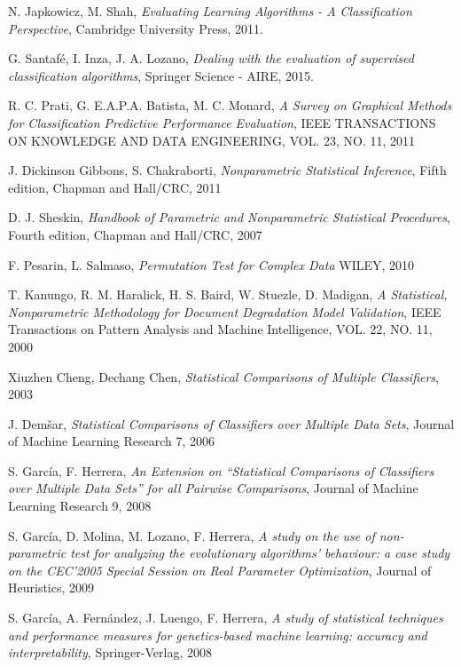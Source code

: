 \begin{thebibliography}{99}

  N. Japkowicz, M. Shah,
  \emph{Evaluating Learning Algorithms - A Classification Perspective},
  Cambridge University Press,
  2011.

  G. Santafé, I. Inza, J. A. Lozano,
  \emph{Dealing with the evaluation of supervised classification algorithms},
  Springer Science - AIRE,
  2015.
  
  R. C. Prati, G. E.A.P.A. Batista, M. C. Monard,
  \emph{A Survey on Graphical Methods for Classification Predictive Performance Evaluation},
  IEEE TRANSACTIONS ON KNOWLEDGE AND DATA ENGINEERING, VOL. 23, NO. 11,
  2011

  J. Dickinson Gibbons, S. Chakraborti,
  \emph{Nonparametric Statistical Inference},
  Fifth edition,
  Chapman and Hall/CRC,
  2011
	
  D. J. Sheskin,
  \emph{Handbook of Parametric and Nonparametric Statistical Procedures},
  Fourth edition,
  Chapman and Hall/CRC,
  2007
  
	F. Pesarin, L. Salmaso,
	\emph{Permutation Test for Complex Data}
	WILEY, 
	2010
  
	T. Kanungo, R. M. Haralick, H. S. Baird, W. Stuezle, D. Madigan,
  \emph{A Statistical, Nonparametric Methodology for Document Degradation Model Validation},
  IEEE Transactions on Pattern Analysis and Machine Intelligence,
  VOL. 22, NO. 11,
  2000
  
	Xiuzhen Cheng, Dechang Chen,
  	\emph{Statistical Comparisons of Multiple Classifiers},
  	2003
  
	J. Dem\v{s}ar,
	\emph{Statistical Comparisons of Classifiers over Multiple Data Sets},
	Journal of Machine Learning Research 7,
	2006
	
	
	S. García, F. Herrera,
	\emph{An Extension on ``Statistical Comparisons of Classifiers over Multiple Data Sets'' for all Pairwise Comparisons},
	Journal of Machine Learning Research 9,
	2008
	
	S. García, D. Molina, M. Lozano, F. Herrera,
	\emph{A study on the use of non-parametric test for analyzing the evolutionary algorithms' behaviour: a case study on the CEC'2005 Special Session on Real Parameter Optimization},
	Journal of Heuristics,
	2009

	S. García, A. Fernández, J. Luengo, F. Herrera,
	\emph{A study of statistical techniques and performance measures for genetics-based machine learning: accuracy and interpretability},
	Springer-Verlag,
	2008
	

\end{thebibliography}
